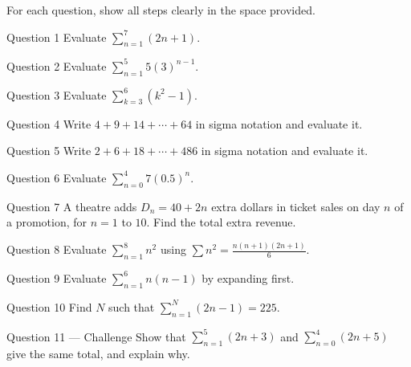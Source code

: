 \documentclass[11pt]{article}
\begin{document}
\clearpage
{}
For each question, show all steps clearly in the space provided.

\begin{qbox}{Question 1}
Evaluate $\displaystyle\sum_{n=1}^{7}(2n+1)$.\workspace{2.4cm}
\end{qbox}

\begin{qbox}{Question 2}
Evaluate $\displaystyle\sum_{n=1}^{5}5(3)^{n-1}$.\workspace{2.4cm}
\end{qbox}

\begin{qbox}{Question 3}
Evaluate $\displaystyle\sum_{k=3}^{6}(k^2-1)$.\workspace{2.4cm}
\end{qbox}

\begin{qbox}{Question 4}
Write $4+9+14+\cdots+64$ in sigma notation and evaluate it.\workspace{2.4cm}
\end{qbox}

\begin{qbox}{Question 5}
Write $2+6+18+\cdots+486$ in sigma notation and evaluate it.\workspace{2.4cm}
\end{qbox}

\begin{qbox}{Question 6}
Evaluate $\displaystyle\sum_{n=0}^{4}7(0.5)^{n}$.\workspace{2.4cm}
\end{qbox}

\begin{qbox}{Question 7}
A theatre adds $D_n=40+2n$ extra dollars in ticket sales on day $n$ of a promotion, for $n=1$ to $10$. Find the total extra revenue.\workspace{2.4cm}
\end{qbox}

\begin{qbox}{Question 8}
Evaluate $\displaystyle\sum_{n=1}^{8}n^2$ using $\sum n^2=\tfrac{n(n+1)(2n+1)}6$.\workspace{2.4cm}
\end{qbox}

\begin{qbox}{Question 9}
Evaluate $\displaystyle\sum_{n=1}^{6}n(n-1)$ by expanding first.\workspace{2.4cm}
\end{qbox}

\begin{qbox}{Question 10}
Find $N$ such that $\displaystyle\sum_{n=1}^{N}(2n-1)=225$.\workspace{2.4cm}
\end{qbox}

\begin{qbox}{Question 11 --- Challenge}
Show that $\displaystyle\sum_{n=1}^{5}(2n+3)$ and $\displaystyle\sum_{n=0}^{4}(2n+5)$ give the same total, and explain why.\workspace{3.2cm}
\end{qbox}
\end{document}
